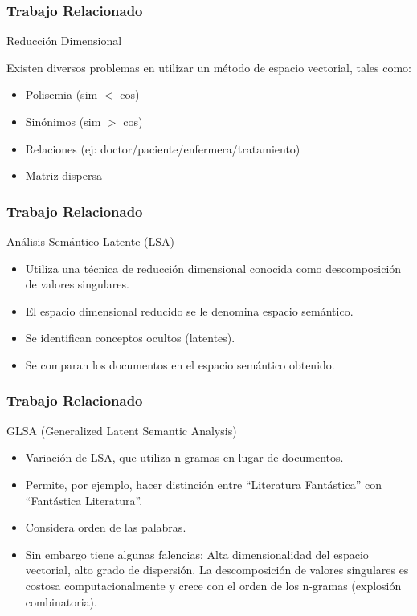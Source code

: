 \documentclass{beamer}
\begin{document}

\begin{frame}
\frametitle{Trabajo Relacionado}
Reducción Dimensional

Existen diversos problemas en utilizar un método de espacio vectorial, tales como:
\begin{itemize}
\item Polisemia (sim $<$ cos)
\item Sinónimos (sim $>$ cos)
\item Relaciones (ej: doctor/paciente/enfermera/tratamiento)
\item Matriz dispersa
\end{itemize}

\end{frame}


\begin{frame}
\frametitle{Trabajo Relacionado}
Análisis Semántico Latente (LSA)

\begin{itemize}
\item Utiliza una técnica de reducción dimensional conocida como descomposición de valores singulares.
\item El espacio dimensional reducido se le denomina espacio semántico.
\item Se identifican conceptos ocultos (latentes).
\item Se comparan los documentos en el espacio semántico obtenido.
\end{itemize}

\end{frame}


\begin{frame}
\frametitle{Trabajo Relacionado}

GLSA (Generalized Latent Semantic Analysis)
\begin{itemize}
\item Variación de LSA, que utiliza n-gramas en lugar de documentos.
\item Permite, por ejemplo, hacer distinción entre ``Literatura Fantástica'' con ``Fantástica Literatura''.
\item Considera orden de las palabras.
\item Sin embargo tiene algunas falencias: Alta dimensionalidad del espacio vectorial, alto grado de dispersión. La descomposición de valores singulares es costosa computacionalmente y crece con el orden de los n-gramas (explosión combinatoria).
\end{itemize}

\end{frame}
\end{document}
